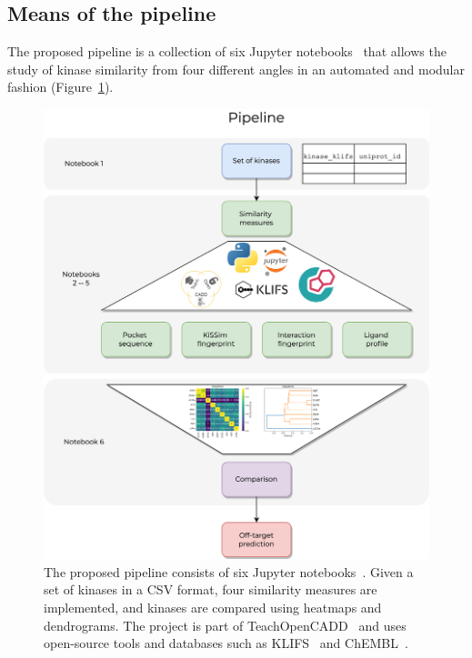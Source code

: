 \documentclass[9pt,training,ASAPversion]{livecoms}
\begin{document}
\subsection{Means of the pipeline}
The proposed pipeline is a collection of six Jupyter notebooks~\cite{Kluyver_2016_Jupyter} that allows the study of kinase similarity from four different angles in an automated and modular fashion (Figure~\ref{fig:pipeline}).

\begin{figure}[ht]
    \centering
    \includegraphics[width=\columnwidth]{Pipeline.png}
    \caption{The proposed pipeline consists of six Jupyter notebooks~\cite{Kluyver_2016_Jupyter}. Given a set of kinases in a CSV format, four similarity measures are implemented, and kinases are compared using heatmaps and dendrograms. The project is part of TeachOpenCADD~\cite{Sydow_2019_JCheminform, sydow_2022_nar} and uses open-source tools and databases such as KLIFS~\cite{Kanev_2020_NAR} and ChEMBL~\cite{Gaulton_2016_nar}.}
    \label{fig:pipeline}
\end{figure}
\end{document}
